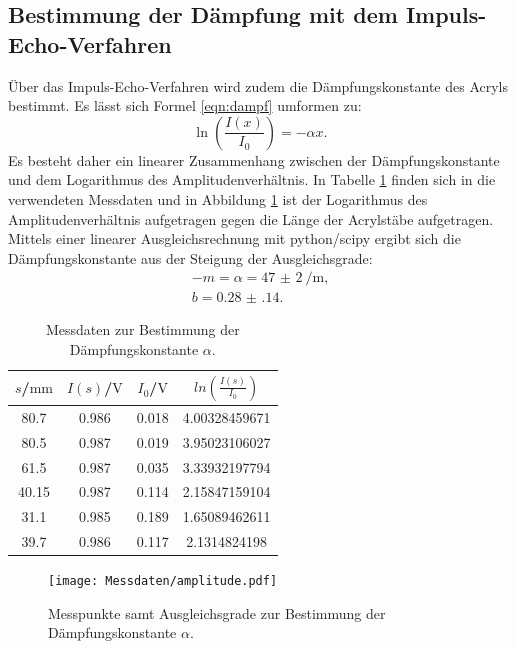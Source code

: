 \subsection{Bestimmung der Dämpfung mit dem Impuls-Echo-Verfahren}
Über das Impuls-Echo-Verfahren wird zudem die Dämpfungskonstante des Acryls bestimmt.
Es lässt sich Formel \eqref{eqn:dampf} umformen zu:
\begin{equation}
  \ln{\left( \frac{I(x)}{I_0}\right)}=-\alpha x \text{.}
\end{equation}
Es besteht daher ein linearer Zusammenhang zwischen der Dämpfungskonstante und dem Logarithmus des Amplitudenverhältnis.
In Tabelle \ref{tab:daempf} finden sich in die verwendeten Messdaten und in Abbildung \ref{fig:daempf} ist der Logarithmus des Amplitudenverhältnis aufgetragen gegen die Länge der Acrylstäbe aufgetragen.
Mittels einer linearer Ausgleichsrechnung mit python/scipy \cite{scipy} ergibt sich die Dämpfungskonstante aus der Steigung der Ausgleichsgrade:
\begin{gather*}
-m=\alpha=\SI{47(2)}{\per\meter} \text{,}\\
b=  \num{0.28(14)}\text{.}
\end{gather*}


\begin{table}
\centering
\caption{Messdaten zur Bestimmung der Dämpfungskonstante $\alpha$.}
\label{tab:daempf}
\begin{tabular}{cccc}
  \toprule
$s$/$\si{\milli\meter}$ & $I(s)$/$\si{\volt}$ & $I_0$/$\si{\volt}$ & $ln\left(\frac{I(s)}{I_0}\right)$ \\
\midrule
80.7 & 0.986 & 0.018 & 4.00328459671 \\
80.5 & 0.987 & 0.019 & 3.95023106027 \\
61.5 & 0.987 & 0.035 & 3.33932197794 \\
40.15 & 0.987 & 0.114 & 2.15847159104 \\
31.1 & 0.985 & 0.189 & 1.65089462611 \\
39.7 & 0.986 & 0.117 & 2.1314824198 \\
\bottomrule
\end{tabular}
\end{table}

\begin{figure}
  \centering
  \texttt{[image: Messdaten/amplitude.pdf]}
  \caption{Messpunkte samt Ausgleichsgrade zur Bestimmung der Dämpfungskonstante $\alpha$.}
  \label{fig:daempf}
\end{figure}
\FloatBarrier
